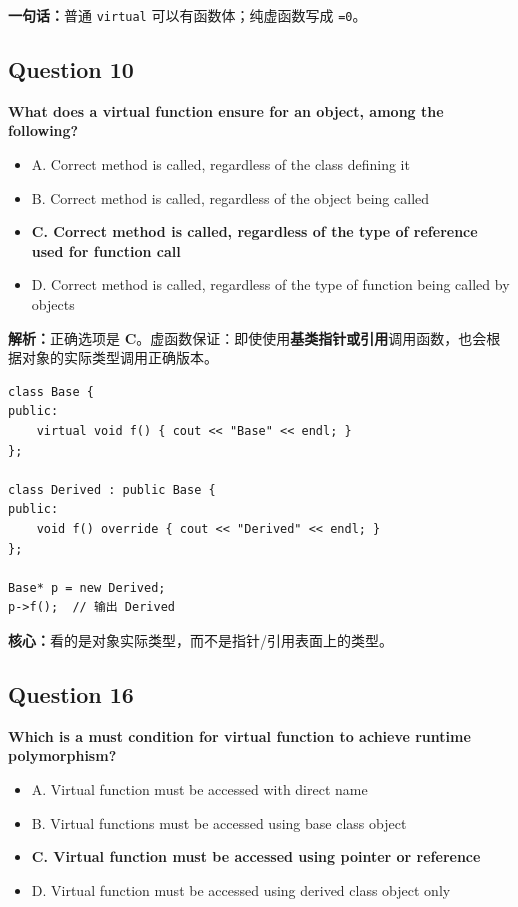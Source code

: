 \documentclass[11pt, a4paper]{article}
\begin{document}
\textbf{一句话：}普通 \texttt{virtual} 可以有函数体；纯虚函数写成 \texttt{=0}。


\subsection*{Question 10}
\textbf{What does a virtual function ensure for an object, among the following?}
\begin{itemize}
    \item A. Correct method is called, regardless of the class defining it
    \item B. Correct method is called, regardless of the object being called
    \item \textbf{C. Correct method is called, regardless of the type of reference used for function call}
    \item D. Correct method is called, regardless of the type of function being called by objects
\end{itemize}

\textbf{解析：}正确选项是 \textbf{C}。虚函数保证：即使使用\textbf{基类指针或引用}调用函数，也会根据对象的实际类型调用正确版本。
\begin{lstlisting}
class Base {
public:
    virtual void f() { cout << "Base" << endl; }
};

class Derived : public Base {
public:
    void f() override { cout << "Derived" << endl; }
};

Base* p = new Derived;
p->f();  // 输出 Derived
\end{lstlisting}

\textbf{核心：}看的是对象实际类型，而不是指针/引用表面上的类型。


\subsection*{Question 16}
\textbf{Which is a must condition for virtual function to achieve runtime polymorphism?}
\begin{itemize}
    \item A. Virtual function must be accessed with direct name
    \item B. Virtual functions must be accessed using base class object
    \item \textbf{C. Virtual function must be accessed using pointer or reference}
    \item D. Virtual function must be accessed using derived class object only
\end{itemize}
\end{document}
